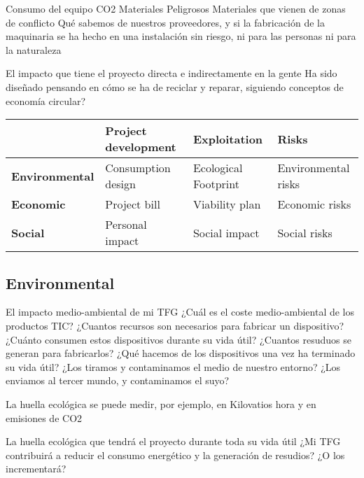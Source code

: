 Consumo del equipo
CO2
Materiales Peligrosos
Materiales que vienen de zonas de conflicto
Qué sabemos de nuestros proveedores, y si la fabricación de la maquinaria se ha
hecho en una instalación sin riesgo, ni para las personas ni para la naturaleza

El impacto que tiene el proyecto directa e indirectamente en la gente
Ha sido diseñado pensando en cómo se ha de reciclar y reparar, siguiendo
conceptos de economía circular?

\begin{table}[]
\begin{tabular}{|l|l|l|l|}
\hline
                       & \textbf{Project development} & \textbf{Exploitation} & \textbf{Risks}      \\ \hline
\textbf{Environmental} & Consumption design           & Ecological Footprint  & Environmental risks \\ \hline
\textbf{Economic}      & Project bill                 & Viability plan        & Economic risks      \\ \hline
\textbf{Social}        & Personal impact              & Social impact         & Social risks        \\ \hline
\end{tabular}
\end{table}

\subsection{Environmental}
El impacto medio-ambiental de mi TFG
¿Cuál es el coste medio-ambiental de los productos TIC?
¿Cuantos recursos son necesarios para fabricar un dispositivo?
¿Cuánto consumen estos dispositivos durante su vida útil?
¿Cuantos resuduos se generan para fabricarlos?
¿Qué hacemos de los dispositivos una vez ha terminado su vida útil? ¿Los tiramos y
contaminamos el medio de nuestro entorno? ¿Los enviamos al tercer mundo, y
contaminamos el suyo?

La huella ecológica se puede medir, por ejemplo, en Kilovatios hora y en emisiones
de CO2

La huella ecológica que tendrá el proyecto durante toda su vida útil
¿Mi TFG contribuirá a reducir el consumo energético y la generación de resudios?
¿O los incrementará?





